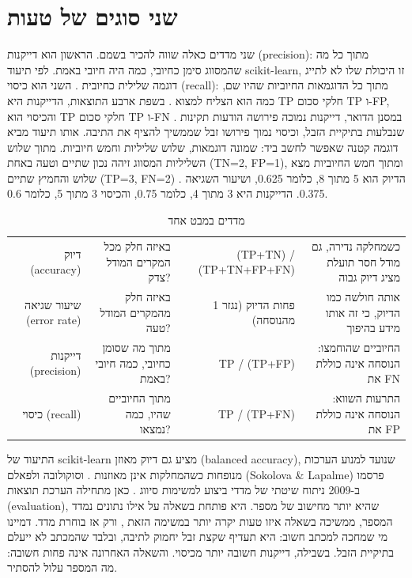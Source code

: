\section{שני סוגים של טעות}
שני מדדים כאלה שווה להכיר בשמם. הראשון הוא דייקנות (precision): מתוך כל מה שהמסווג סימן כחיובי, כמה היה חיובי באמת. לפי תיעוד scikit-learn, זו היכולת שלו לא לתייג דוגמה שלילית כחיובית \cite{S-ch05-01}. השני הוא כיסוי (recall): מתוך כל הדוגמאות החיוביות שהיו שם, כמה הוא הצליח למצוא \cite{S-ch05-01}. בשפת ארבע התוצאות, הדייקנות היא TP חלקי סכום TP ו-FP, והכיסוי הוא TP חלקי סכום TP ו-FN \cite{S-ch05-06}. במסנן הדואר, דייקנות נמוכה פירושה הודעות תקינות שנבלעות בתיקיית הזבל, וכיסוי נמוך פירושו זבל שממשיך להציף את התיבה.
אותו תיעוד מביא דוגמה קטנה שאפשר לחשב ביד: שמונה דוגמאות, שלוש שליליות וחמש חיוביות. מתוך שלוש השליליות המסווג זיהה נכון שתיים וטעה באחת (TN=2, FP=1), ומתוך חמש החיוביות מצא שלוש והחמיץ שתיים (TP=3, FN=2) \cite{S-ch05-01}. הדיוק הוא 5 מתוך 8, כלומר 0.625, ושיעור השגיאה 0.375. הדייקנות היא 3 מתוך 4, כלומר 0.75, והכיסוי 3 מתוך 5, כלומר 0.6.
\begin{table}[htbp]
\centering
\caption{מדדים במבט אחד}\label{tab:5.1}
\begingroup\small\renewcommand{\arraystretch}{1.35}\booktablerule
\begin{tabularx}{\linewidth}{RRRR}
\toprule
{} &  &  & \\ \midrule
דיוק (accuracy) & באיזה חלק מכל המקרים המודל צדק? & (TP+TN) / (TP+TN+FP+FN) \cite{S-ch05-06} & כשמחלקה נדירה, גם מודל חסר תועלת מציג דיוק גבוה \cite{S-ch05-06}\\
שיעור שגיאה (error rate) & באיזה חלק מהמקרים המודל טעה? & 1 פחות הדיוק (נגזר מהנוסחה) & אותה חולשה כמו הדיוק, כי זה אותו מידע בהיפוך\\
דייקנות (precision) & מתוך מה שסומן כחיובי, כמה חיובי באמת? & TP / (TP+FP) \cite{S-ch05-06} & החיוביים שהוחמצו: הנוסחה אינה כוללת את FN\\
כיסוי (recall) & מתוך החיוביים שהיו, כמה נמצאו? & TP / (TP+FN) \cite{S-ch05-06} & התרעות השווא: הנוסחה אינה כוללת את FP\\
\bottomrule
\end{tabularx}
\endgroup
\end{table}
התיעוד של scikit-learn מציע גם דיוק מאוזן (balanced accuracy), שנועד למנוע הערכות מנופחות כשהמחלקות אינן מאוזנות \cite{S-ch05-01}. וסוקולובה ולפאלם (Sokolova \& Lapalme) פרסמו ב-2009 ניתוח שיטתי של מדדי ביצוע למשימות סיווג \cite{S-ch05-11}.
כאן מתחילה הערכת תוצאות (evaluation), שהיא יותר מחישוב של מספר. היא פותחת בשאלה על אילו נתונים נמדד המספר, ממשיכה בשאלה איזו טעות יקרה יותר במשימה הזאת \cite{S-ch05-06}, ורק אז בוחרת מדד. דמיינו מי שמחכה למכתב חשוב: היא תעדיף שקצת זבל יחמוק לתיבה, ובלבד שהמכתב לא ייעלם בתיקיית הזבל. בשבילה, דייקנות חשובה יותר מכיסוי. והשאלה האחרונה אינה פחות חשובה: מה המספר עלול להסתיר.

